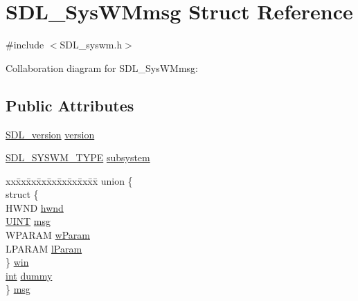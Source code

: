 \hypertarget{struct_s_d_l___sys_w_mmsg}{\section{S\-D\-L\-\_\-\-Sys\-W\-Mmsg Struct Reference}
\label{struct_s_d_l___sys_w_mmsg}
}


{\ttfamily \#include $<$S\-D\-L\-\_\-syswm.\-h$>$}



Collaboration diagram for S\-D\-L\-\_\-\-Sys\-W\-Mmsg\-:
\subsection*{Public Attributes}
\begin{DoxyCompactItemize}
\item 
\hyperlink{struct_s_d_l__version}{S\-D\-L\-\_\-version} \hyperlink{struct_s_d_l___sys_w_mmsg_a95f9aae58d18ee8fac556416b322a5fb}{version}
\item 
\hyperlink{_s_d_l__syswm_8h_a064c26598287280fff2a00d6758ac4f7}{S\-D\-L\-\_\-\-S\-Y\-S\-W\-M\-\_\-\-T\-Y\-P\-E} \hyperlink{struct_s_d_l___sys_w_mmsg_a7c3900af5ea797f1318fc77ee0ecd11b}{subsystem}
\item 
\begin{tabbing}
xx\=xx\=xx\=xx\=xx\=xx\=xx\=xx\=xx\=\kill
union \{\\
\>struct \{\\
\>\>HWND \hyperlink{struct_s_d_l___sys_w_mmsg_a55cf9583b5eddfe60a5c9851f9cce457}{hwnd}\\
\>\>\hyperlink{_g_l_tools_2include_2_g_l_2wglew_8h_a2cedd0ac2b26123330d3366994684b52}{UINT} \hyperlink{struct_s_d_l___sys_w_mmsg_a74894ed060d5508ab06aac584154d61e}{msg}\\
\>\>WPARAM \hyperlink{struct_s_d_l___sys_w_mmsg_a7463730478d90ebc031d83098f3f74fc}{wParam}\\
\>\>LPARAM \hyperlink{struct_s_d_l___sys_w_mmsg_a24c1e4c3cb8d9781d34e5d99df66ac36}{lParam}\\
\>\} \hyperlink{struct_s_d_l___sys_w_mmsg_a4a2c604644a582e72fa86bca36b1b808}{win}\\
\>\hyperlink{_s_d_l__thread_8h_a6a64f9be4433e4de6e2f2f548cf3c08e}{int} \hyperlink{struct_s_d_l___sys_w_mmsg_a8faf13f90f2477157b42b631308cd900}{dummy}\\
\} \hyperlink{struct_s_d_l___sys_w_mmsg_a8890abd547a386afa3a822f15568c162}{msg}\\

\end{tabbing}\end{DoxyCompactItemize}


